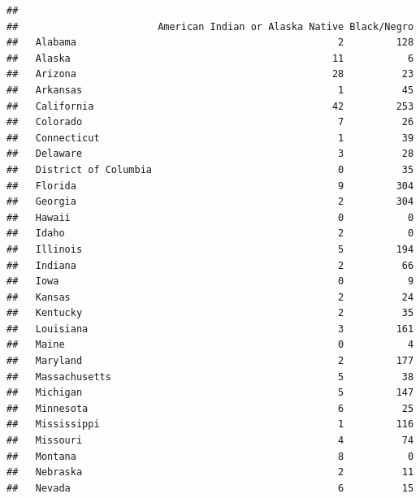 \documentclass[]{book}
\newenvironment{Shaded}{\begin{snugshade}}{\end{snugshade}}
\newcommand{\KeywordTok}[1]{\textcolor[rgb]{0.13,0.29,0.53}{\textbf{#1}}}
\newcommand{\NormalTok}[1]{#1}
\newcommand{\OperatorTok}[1]{\textcolor[rgb]{0.81,0.36,0.00}{\textbf{#1}}}
\newcommand{\StringTok}[1]{\textcolor[rgb]{0.31,0.60,0.02}{#1}}
\theoremstyle{definition}
\theoremstyle{definition}
\theoremstyle{definition}
\theoremstyle{remark}
\begin{document}
\begin{Shaded}
\end{Shaded}

\begin{verbatim}
##                       
##                        American Indian or Alaska Native Black/Negro
##   Alabama                                             2         128
##   Alaska                                             11           6
##   Arizona                                            28          23
##   Arkansas                                            1          45
##   California                                         42         253
##   Colorado                                            7          26
##   Connecticut                                         1          39
##   Delaware                                            3          28
##   District of Columbia                                0          35
##   Florida                                             9         304
##   Georgia                                             2         304
##   Hawaii                                              0           0
##   Idaho                                               2           0
##   Illinois                                            5         194
##   Indiana                                             2          66
##   Iowa                                                0           9
##   Kansas                                              2          24
##   Kentucky                                            2          35
##   Louisiana                                           3         161
##   Maine                                               0           4
##   Maryland                                            2         177
##   Massachusetts                                       5          38
##   Michigan                                            5         147
##   Minnesota                                           6          25
##   Mississippi                                         1         116
##   Missouri                                            4          74
##   Montana                                             8           0
##   Nebraska                                            2          11
##   Nevada                                              6          15

\end{verbatim}
\end{document}
